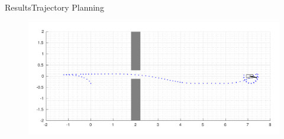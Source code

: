\begin{frame}{Results}{Trajectory Planning}
\hspace{-1cm}
\begin{minipage}{1\textwidth}
  \begin{figure}[H]
    \includegraphics[width=1.15\textwidth]{figures/trajectoryAnimation}
  \end{figure}
\end{minipage}
\end{frame}